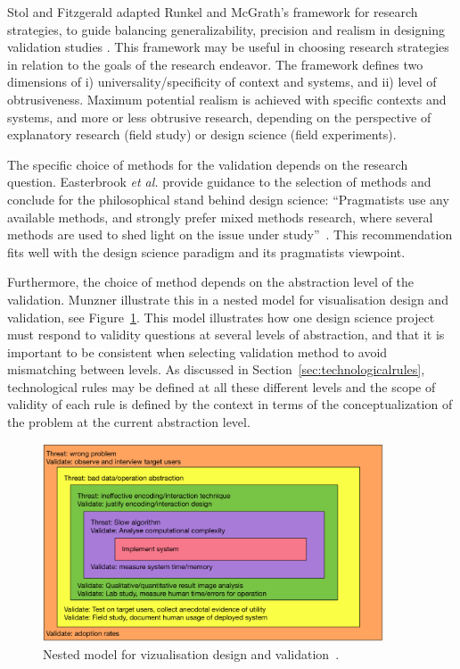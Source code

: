 \documentclass[graybox]{svmult}
\begin{document}
Stol and Fitzgerald adapted Runkel and McGrath's framework for research strategies, to guide balancing generalizability, precision and realism in designing validation studies \cite{StolABC18}. This framework may be useful in choosing research strategies in relation to the goals of the research endeavor. The framework defines two dimensions of i) universality/specificity of context and systems, and ii) level of obtrusiveness. Maximum potential realism is achieved with specific contexts and systems, and more or less obtrusive research, depending on the perspective of explanatory research (field study) or design science (field experiments).  

The specific choice of methods for the validation depends on the research question. Easterbrook \emph{et al.} provide guidance to the selection of methods and conclude for the philosophical stand behind design science: ``Pragmatists use any available methods, and strongly prefer mixed methods research, where several methods are used to shed light on the issue under study''~\cite{easterbrook_selecting_2008}. This recommendation fits well with the design science paradigm and its pragmatists viewpoint.

Furthermore, the choice of method depends on the abstraction level of the validation. Munzner illustrate this in a nested model for visualisation design and validation, see Figure~\ref{fig:nested_model}. This model illustrates how one design science project must respond to validity questions at several levels of abstraction, and that it is important to be consistent when selecting validation method to avoid mismatching between levels. As discussed in Section~\ref{sec:technologicalrules}, technological rules may be defined at all these different levels and the scope of validity of each rule is defined by the context in terms of the conceptualization of the problem at the current abstraction level.

\begin{figure}[t]
  \includegraphics[width=0.9\textwidth]{Figures/nested_model.pdf}
\caption{Nested model for vizualisation design and validation~\cite{munzner2009}.}
\label{fig:nested_model}       %
\end{figure} 
\end{document}
